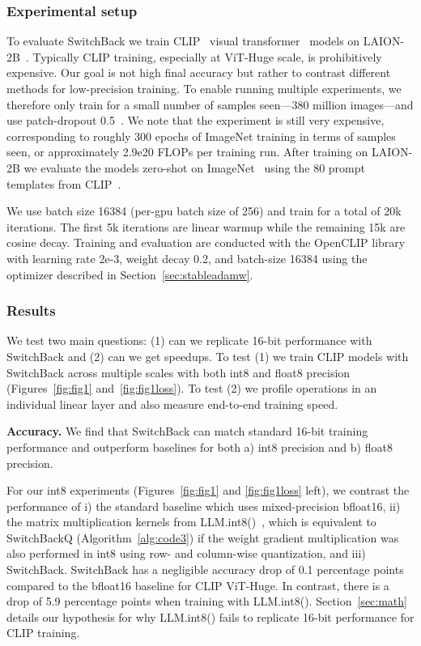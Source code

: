 \subsubsection{Experimental setup}

To evaluate SwitchBack we train CLIP~\cite{radford2021learning} visual transformer~\cite{dosovitskiy2021an} models on LAION-2B~\cite{schuhmann2022laion}. Typically CLIP training, especially at ViT-Huge scale, is prohibitively expensive. Our goal is not high final accuracy but rather to contrast different methods for low-precision training. To enable running multiple experiments, we therefore only train for a small number of samples seen---380 million images---and use patch-dropout 0.5~\cite{li2022scaling}. We note that the experiment is still very expensive, corresponding to roughly 300 epochs of ImageNet training in terms of samples seen, or approximately 2.9e20 FLOPs per training run. After training on LAION-2B we evaluate the models zero-shot on ImageNet~\cite{deng2009imagenet} using the 80 prompt templates from CLIP~\cite{radford2021learning}.

We use batch size 16384 (per-gpu batch size of 256) and train for a total of 20k iterations. The first 5k iterations are linear warmup while the remaining 15k are cosine decay. Training and evaluation are conducted with the OpenCLIP library~\cite{openclip} with learning rate 2e-3, weight decay 0.2, and batch-size 16384 using the optimizer described in Section~\ref{sec:stableadamw}.

\subsubsection{Results}

We test two main questions: (1) can we replicate 16-bit performance with SwitchBack and (2) can we get speedups. To test (1) we train CLIP models with SwitchBack across multiple scales with both int8 and float8 precision (Figures~\ref{fig:fig1} and~\ref{fig:fig1loss}).
To test (2) we profile operations in an individual linear layer and also measure end-to-end training speed.

\textbf{Accuracy.} We find that SwitchBack can match standard 16-bit training performance and outperform baselines for both a) int8 precision and b) float8 precision.

For our int8 experiments (Figures~\ref{fig:fig1} and \ref{fig:fig1loss} left), we contrast the performance of i) the standard baseline which uses mixed-precision bfloat16, ii) the matrix multiplication kernels from LLM.int8()~\cite{dettmers2022llm}, which is equivalent to SwitchBackQ (Algorithm~\ref{alg:code3}) if the weight gradient multiplication was also performed in int8 using row- and column-wise quantization, and iii) SwitchBack. SwitchBack has a negligible accuracy drop of 0.1 percentage points compared to the bfloat16 baseline for CLIP ViT-Huge. In contrast, there is a drop of 5.9 percentage points when training with LLM.int8(). 
Section~\ref{sec:math} details our hypothesis for why LLM.int8() fails to replicate 16-bit performance for CLIP training.

